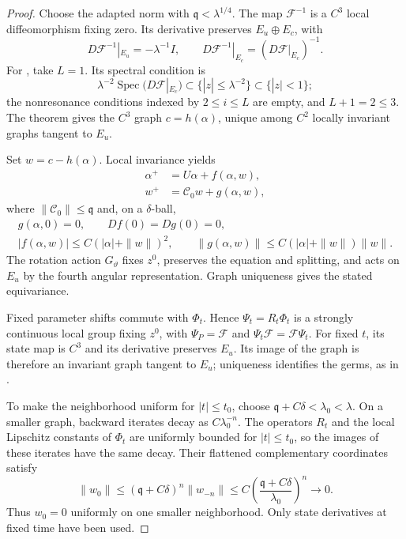 \documentclass[11pt]{amsart}
\theoremstyle{remark}
\numberwithin{equation}{section}
\begin{document}
\begin{proof}
Choose the adapted norm with $\mathfrak q<\lambda^{1/4}$.
The map $\mathcal F^{-1}$ is a $C^3$ local diffeomorphism fixing
zero. Its derivative preserves $E_u\oplus E_c$, with
\[
 D\mathcal F^{-1}|_{E_u}=-\lambda^{-1}I,\qquad
 D\mathcal F^{-1}|_{E_c}=(D\mathcal F|_{E_c})^{-1}.
\]
For \cite[Theorem~1.2]{CFL2003}, take $L=1$. Its spectral condition is
\[
 \lambda^{-2}\operatorname{Spec}(D\mathcal F|_{E_c})
       \subset\{|z|\le\lambda^{-2}\}\subset\{|z|<1\};
\]
the nonresonance conditions indexed by $2\le i\le L$ are empty,
and $L+1=2\le3$. The theorem gives the $C^3$ graph $c=h(\alpha)$,
unique among $C^2$ locally invariant graphs tangent to $E_u$.

Set $w=c-h(\alpha)$. Local invariance yields
\begin{align}\label{pc:flatten}
 \alpha^+&=U\alpha+f(\alpha,w),\\
 w^+&=\mathcal C_0w+g(\alpha,w),\nonumber
\end{align}
where $\|\mathcal C_0\|\le\mathfrak q$ and, on a $\delta$-ball,
\[
 \begin{gathered}
 g(\alpha,0)=0,\qquad Df(0)=Dg(0)=0,\\
 |f(\alpha,w)|\le C(|\alpha|+\|w\|)^2,\qquad
 \|g(\alpha,w)\|\le C(|\alpha|+\|w\|)\|w\|.
 \end{gathered}
\]
The rotation action $G_\vartheta$ fixes $z^0$, preserves the
equation and splitting, and acts on $E_u$ by the fourth angular
representation. Graph uniqueness gives the stated equivariance.

Fixed parameter shifts commute with $\Phi_t$. Hence
$\Psi_t=R_t\Phi_t$ is a strongly continuous local group fixing
$z^0$, with $\Psi_P=\mathcal F$ and
$\Psi_t\mathcal F=\mathcal F\Psi_t$. For fixed $t$, its state map
is $C^3$ and its derivative preserves $E_u$. Its image of the
graph is therefore an invariant graph tangent to $E_u$; uniqueness
identifies the germs, as in \cite[Remark~6]{CFL2003}.

To make the neighborhood uniform for $|t|\le t_0$, choose
$\mathfrak q+C\delta<\lambda_0<\lambda$. On a smaller graph,
backward iterates decay as $C\lambda_0^{-n}$. The operators $R_t$
and the local Lipschitz constants of $\Phi_t$ are uniformly
bounded for $|t|\le t_0$, so the images of these iterates have
the same decay. Their flattened complementary coordinates satisfy
\[
 \|w_0\|\le(\mathfrak q+C\delta)^n\|w_{-n}\|
       \le C\left(\frac{\mathfrak q+C\delta}{\lambda_0}\right)^n
       \longrightarrow0.
\]
Thus $w_0=0$ uniformly on one smaller neighborhood. Only state
derivatives at fixed time have been used.
\end{proof}
\end{document}
